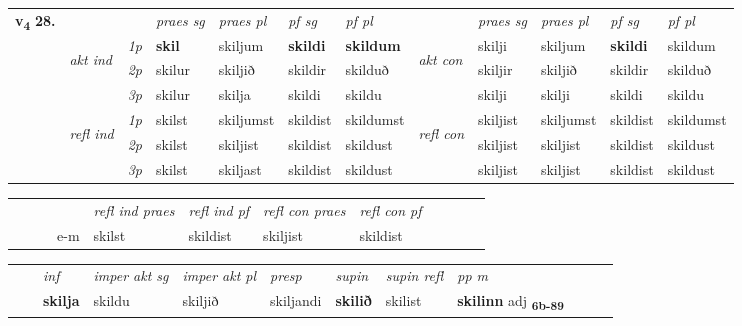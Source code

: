 \begin{tabular}{llllllllllll} \toprule
\multirow{4}{*}{{{\textbf{v{\textsubscript{4}}} \Large{\textbf{28.}}}}}  & &   &  \textit{praes sg}  & \textit{praes pl}  &\textit{ pf sg} & \textit{pf pl} &  &  \textit{praes sg}  & \textit{praes pl}  & \textit{pf sg} & \textit{pf pl } \\*
	\cmidrule{4-7} \cmidrule{9-12}
 & \multirow{3}{*}{\begin{turn}{90}\textit{akt ind}\end{turn}} & {\textit{1p}} & \textbf{skil} & skiljum    & \textbf{skildi} & \textbf{skildum} & \multirow{3}{*}{\begin{turn}{90}\textit{akt con}\end{turn}} &skilji & skiljum & \textbf{skildi} & skildum\\*
& &  {\textit{2p}} &  skilur  & skiljið   & skildir & skilduð & & skiljir & skiljið & skildir & skilduð \\*
& &  {\textit{3p}} & skilur & skilja   & skildi & skildu & & skilji & skilji& skildi & skildu  \\*
\cmidrule{4-7} \cmidrule{9-12}
 &\multirow{3}{*}{\begin{turn}{90}\textit{refl ind}\end{turn}} & {\textit{1p}} & skilst & skiljumst    & skildist & skildumst & \multirow{3}{*}{\begin{turn}{90}\textit{refl con}\end{turn}}  &skiljist & skiljumst & skildist & skildumst\\*
 &&  {\textit{2p}} &  skilst  & skiljist   & skildist & skildust & &skiljist & skiljist & skildist & skildust \\*
& &  {\textit{3p}} & skilst & skiljast   & skildist & skildust & & skiljist & skiljist& skildist & skildust  \\*
\cmidrule{4-7} \cmidrule{9-12}
\end{tabular}


\begin{tabular}{llllllllllll}
 & &  & &  \textit{refl ind praes} & \textit{refl ind pf} & \textit{refl con praes} & \textit{refl con pf} \\*
&  & & e-m & skilst & skildist & skiljist & skildist \\*
\cmidrule{5-9}
\end{tabular}


\begin{tabular}{llllllllllll}
 & & \textit{inf} & \textit{imper akt sg} & \textit{imper akt pl}   & \textit{presp} & \textit{supin} & \textit{supin refl} & \textit{pp m}     \\*
  & & \textbf{skilja} & skildu  & skiljið   & skiljandi &  \textbf{skilið} & skilist & \textbf{skilinn} adj \textbf{\textsubscript{6b-89}} \\*
\cmidrule{1-12}
\end{tabular}



